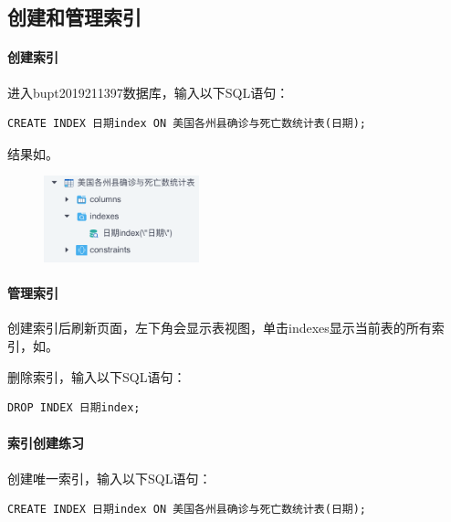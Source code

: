 \documentclass[lang=cn,11pt,a4paper,cite=authornum]{paper}
\begin{document}
\subsection{创建和管理索引}

\paragraph{创建索引}

进入bupt2019211397数据库，输入以下SQL语句：
\begin{code}
\begin{verbatim}
CREATE INDEX 日期index ON 美国各州县确诊与死亡数统计表(日期);
\end{verbatim}
\end{code}

结果如。
\begin{figure}[!htb]
    \centering
    \includegraphics[width=0.4\textwidth]{./images/res13.png}
    \caption{\label{fig:res13}}
\end{figure}

\paragraph{管理索引}

创建索引后刷新页面，左下角会显示表视图，单击indexes显示当前表的所有索引，如。

删除索引，输入以下SQL语句：
\begin{code}
\begin{verbatim}
DROP INDEX 日期index;
\end{verbatim}
\end{code}

\paragraph{索引创建练习}

创建唯一索引，输入以下SQL语句：
\begin{code}
\begin{verbatim}
CREATE INDEX 日期index ON 美国各州县确诊与死亡数统计表(日期);
\end{verbatim}
\end{code}
\end{document}
